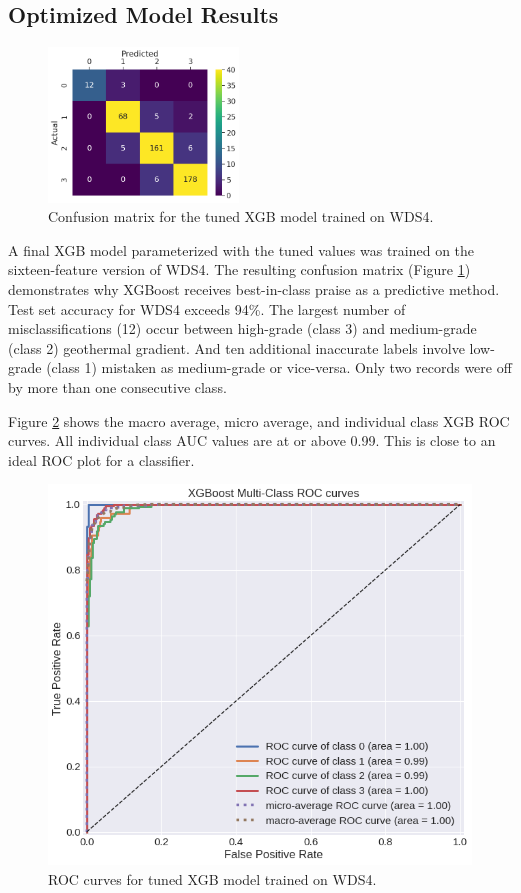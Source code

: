 \subsection{Optimized Model Results}\label{ch5:xgb_final_model}
\begin{figure}
\centering
\includegraphics[width=0.45\textwidth]{templates/images/Figure-XGB16-ConfusionMatrix.png}
\singlespacing
\caption[XGBoost confusion matrix]{Confusion matrix for the tuned XGB model trained on WDS4.}
\label{fig:xgb_conf_matrix}
\end{figure}
A final XGB model parameterized with the tuned values was trained on the sixteen-feature version of WDS4. The resulting confusion matrix (Figure \ref{fig:xgb_conf_matrix}) demonstrates why XGBoost receives best-in-class praise as a predictive method. Test set accuracy for WDS4 exceeds 94\%. The largest number of misclassifications (12) occur between high-grade (class 3) and medium-grade (class 2) geothermal gradient. And ten additional inaccurate labels involve low-grade (class 1) mistaken as medium-grade or vice-versa. Only two records were off by more than one consecutive class. 

Figure \ref{fig:xgb_auc} shows the macro average, micro average, and individual class XGB ROC curves. All individual class AUC values are at or above 0.99. This is close to an ideal ROC plot for a classifier.

\begin{figure}[htp]
\centering
\includegraphics[width=.5\textwidth]{templates/images/Figure-XGB16-AUC.png}
\caption[XGBoost ROC curves]{ROC curves for tuned XGB model trained on WDS4.}
\label{fig:xgb_auc}
\end{figure}

